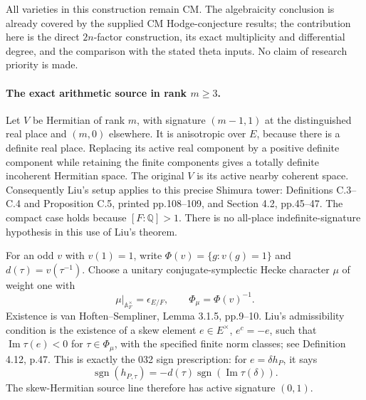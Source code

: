 \documentclass[11pt]{article}
\newcommand{\Q}{\mathbb Q}\newcommand{\C}{\mathbb C}\newcommand{\Z}{\mathbb Z}\newcommand{\R}{\mathbb R}\newcommand{\A}{\mathbb A}\newcommand{\OO}{\mathcal O}
\theoremstyle{definition}\newtheorem{definition}[theorem]{Definition}\newtheorem{remark}[theorem]{Remark}
\begin{document}
All varieties in this construction remain CM. The algebraicity
conclusion is already covered by the supplied CM Hodge-conjecture
results; the contribution here is the direct $2n$-factor construction,
its exact multiplicity and differential degree, and the comparison
with the stated theta inputs. No claim of research priority is made.

\paragraph{The exact arithmetic source in rank $m\geq3$.}
Let $V$ be Hermitian of rank $m$, with signature $(m-1,1)$ at the
distinguished real place and $(m,0)$ elsewhere. It is anisotropic
over $E$, because there is a definite real place. Replacing its active
real component by a positive definite component while retaining the
finite components gives a totally definite incoherent Hermitian
space. The original $V$ is its active nearby coherent space.
Consequently Liu's setup applies to this precise Shimura tower:
Definitions C.3--C.4 and Proposition C.5, printed pp.108--109, and
Section 4.2, pp.45--47. The compact case holds because $[F:\Q]>1$.
There is no all-place indefinite-signature hypothesis in this use
of Liu's theorem.

For an odd $v$ with $v(1)=1$, write
$\Phi(v)=\{g:v(g)=1\}$ and $d(\tau)=v(\tau^{-1})$. Choose a
unitary conjugate-symplectic Hecke character $\mu$ of weight one with
\[
 \mu|_{\A_F^\times}=\epsilon_{E/F},\qquad
 \Phi_\mu=\Phi(v)^{-1}.
\]
Existence is van Hoften--Sempliner, Lemma 3.1.5, pp.9--10.
Liu's admissibility condition is the existence of a skew element
$e\in E^\times$, $e^c=-e$, such that
$\operatorname{Im}\tau(e)<0$ for $\tau\in\Phi_\mu$, with the
specified finite norm classes; see Definition 4.12, p.47. This is
exactly the 032 sign prescription: for $e=\delta h_P$, it says
\[
 \operatorname{sgn}(h_{P,\tau})
   =-d(\tau)\operatorname{sgn}(\operatorname{Im}\tau(\delta)).
\]
The skew-Hermitian source line therefore has active signature
$(0,1)$.
\end{document}

